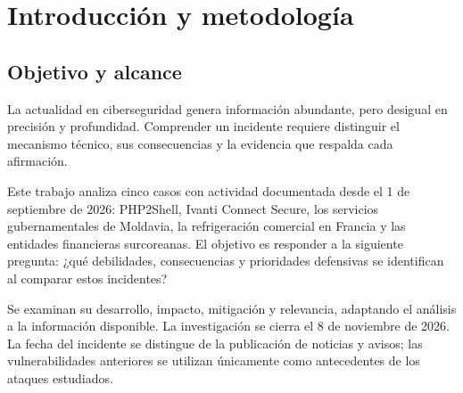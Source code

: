 \chapter{Introducción y metodología}
\label{chap:metodologia}

\section{Objetivo y alcance}
La actualidad en ciberseguridad genera información
abundante, pero desigual en precisión y profundidad.
Comprender un incidente requiere distinguir el mecanismo
técnico, sus consecuencias y la evidencia que respalda
cada afirmación.

Este trabajo analiza cinco casos con actividad
documentada desde el 1 de septiembre de 2026:
PHP2Shell, Ivanti Connect Secure, los servicios
gubernamentales de Moldavia, la refrigeración comercial
en Francia y las entidades financieras surcoreanas.
El objetivo es responder a la siguiente pregunta:
¿qué debilidades, consecuencias y prioridades defensivas
se identifican al comparar estos incidentes?

Se examinan su desarrollo, impacto, mitigación y
relevancia, adaptando el análisis a la información
disponible. La investigación se cierra el
8 de noviembre de 2026. La fecha del incidente
se distingue de la publicación de noticias y avisos;
las vulnerabilidades anteriores se utilizan únicamente
como antecedentes de los ataques estudiados.